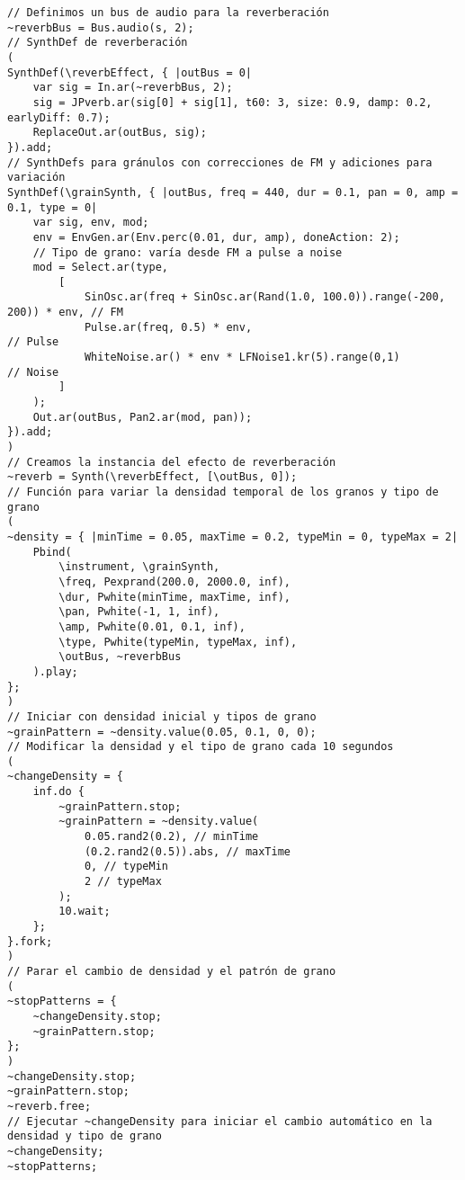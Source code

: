 \begin{minipage}[t]{1\textwidth}
    \centering
\begin{lstlisting}[style=SuperCollider-IDE, basicstyle=\footnotesize\ttfamily, numbers=none]
// Definimos un bus de audio para la reverberación
~reverbBus = Bus.audio(s, 2);
// SynthDef de reverberación
(
SynthDef(\reverbEffect, { |outBus = 0|
    var sig = In.ar(~reverbBus, 2);
    sig = JPverb.ar(sig[0] + sig[1], t60: 3, size: 0.9, damp: 0.2, earlyDiff: 0.7);
    ReplaceOut.ar(outBus, sig);
}).add;
// SynthDefs para gránulos con correcciones de FM y adiciones para variación
SynthDef(\grainSynth, { |outBus, freq = 440, dur = 0.1, pan = 0, amp = 0.1, type = 0|
    var sig, env, mod;
    env = EnvGen.ar(Env.perc(0.01, dur, amp), doneAction: 2);
    // Tipo de grano: varía desde FM a pulse a noise
    mod = Select.ar(type,
        [
            SinOsc.ar(freq + SinOsc.ar(Rand(1.0, 100.0)).range(-200, 200)) * env, // FM
            Pulse.ar(freq, 0.5) * env,                                            // Pulse
            WhiteNoise.ar() * env * LFNoise1.kr(5).range(0,1)                    // Noise
        ]
    );
    Out.ar(outBus, Pan2.ar(mod, pan));
}).add;
)
// Creamos la instancia del efecto de reverberación
~reverb = Synth(\reverbEffect, [\outBus, 0]);
// Función para variar la densidad temporal de los granos y tipo de grano
(
~density = { |minTime = 0.05, maxTime = 0.2, typeMin = 0, typeMax = 2|
    Pbind(
        \instrument, \grainSynth,
        \freq, Pexprand(200.0, 2000.0, inf),
        \dur, Pwhite(minTime, maxTime, inf),
        \pan, Pwhite(-1, 1, inf),
        \amp, Pwhite(0.01, 0.1, inf),
        \type, Pwhite(typeMin, typeMax, inf),
        \outBus, ~reverbBus
    ).play;
};
)
// Iniciar con densidad inicial y tipos de grano
~grainPattern = ~density.value(0.05, 0.1, 0, 0);
// Modificar la densidad y el tipo de grano cada 10 segundos
(
~changeDensity = {
    inf.do {
        ~grainPattern.stop;
        ~grainPattern = ~density.value(
            0.05.rand2(0.2), // minTime
            (0.2.rand2(0.5)).abs, // maxTime
            0, // typeMin
            2 // typeMax
        );
        10.wait;
    };
}.fork;
)
// Parar el cambio de densidad y el patrón de grano
(
~stopPatterns = {
    ~changeDensity.stop;
    ~grainPattern.stop;
};
)
~changeDensity.stop;
~grainPattern.stop;
~reverb.free;
// Ejecutar ~changeDensity para iniciar el cambio automático en la densidad y tipo de grano
~changeDensity;
~stopPatterns;
    \end{lstlisting}
    \vspace{1cm}
\end{minipage}

















